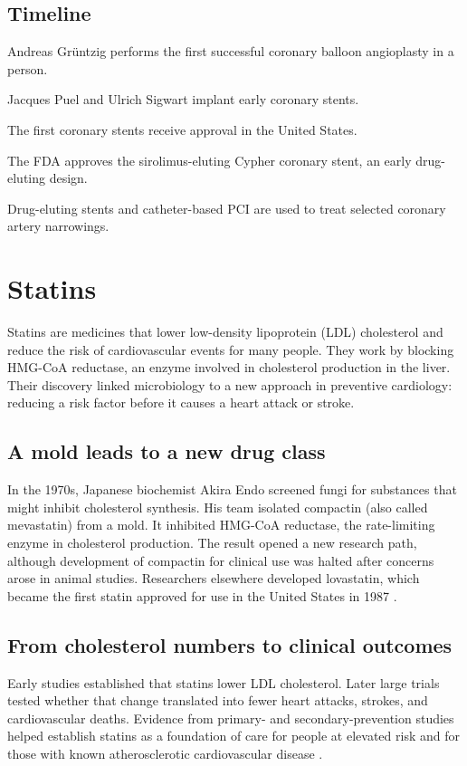 \documentclass[12pt,oneside]{book}
\begin{document}
\section*{Timeline}
\begin{description}[leftmargin=2.3cm,style=nextline]
  \item[1977] Andreas Gr\"untzig performs the first successful coronary balloon angioplasty in a person.
  \item[1986] Jacques Puel and Ulrich Sigwart implant early coronary stents.
  \item[1994] The first coronary stents receive approval in the United States.
  \item[2003] The FDA approves the sirolimus-eluting Cypher coronary stent, an early drug-eluting design.
  \item[Today] Drug-eluting stents and catheter-based PCI are used to treat selected coronary artery narrowings.
\end{description}
\chapter[Statins]{Statins}

Statins are medicines that lower low-density lipoprotein (LDL) cholesterol
and reduce the risk of cardiovascular events for many people. They work
by blocking HMG-CoA reductase, an enzyme involved in cholesterol
production in the liver. Their discovery linked microbiology to a new
approach in preventive cardiology: reducing a risk factor before it
causes a heart attack or stroke.

\section{A mold leads to a new drug class}
In the 1970s, Japanese biochemist Akira Endo screened fungi for substances
that might inhibit cholesterol synthesis. His team isolated compactin
(also called mevastatin) from a mold. It inhibited HMG-CoA reductase, the
rate-limiting enzyme in cholesterol production. The result opened a new
research path, although development of compactin for clinical use was
halted after concerns arose in animal studies. Researchers elsewhere
developed lovastatin, which became the first statin approved for use in
the United States in 1987 \cite{statinHistory,fdaStatinHistory}.

\section{From cholesterol numbers to clinical outcomes}
Early studies established that statins lower LDL cholesterol. Later large
trials tested whether that change translated into fewer heart attacks,
strokes, and cardiovascular deaths. Evidence from primary- and
secondary-prevention studies helped establish statins as a foundation of
care for people at elevated risk and for those with known atherosclerotic
cardiovascular disease \cite{statinHistory}.
\end{document}
